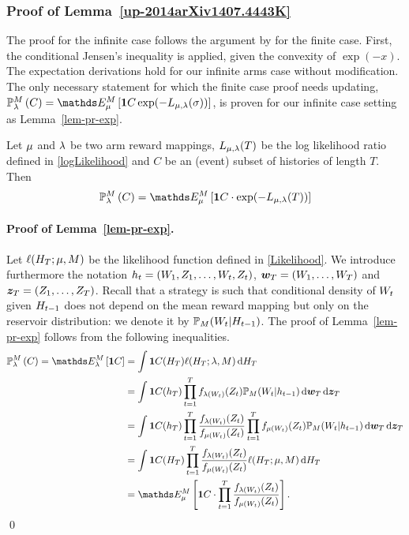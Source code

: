 \subsubsection{Proof of Lemma~\ref{up-2014arXiv1407.4443K}}

The proof for the infinite case follows the argument by \cite{JMLR15} for the
finite case. First, the conditional Jensen's inequality is applied, given the
convexity of
$\exp(-x)$.
The expectation derivations hold for our infinite arms case without
modification.
The only necessary statement for which the finite case proof needs updating,
$\PrAltModel{C} = \ETrueModel{ \1{C} \exp(-L_{\ArmMean,\ArmMeanAlt}(\sigma)) }$,
is proven for our infinite case setting as Lemma~\ref{lem-pr-exp}.


\begin{lemma}\label{lem-pr-exp}
Let $\mu$ and $\lambda$ be two arm reward mappings,
$L_{\mu,\lambda}(T)$ be the log likelihood ratio defined in \eqref{logLikelihood}
and $C$ be an (event) subset of histories of length $T$.
Then
\begin{align*}
\PrAltModel{C}
	= \ETrueModel{ \1{C} \cdot \exp(-L_{\ArmMean,\ArmMeanAlt}(T)) }
\end{align*}
\end{lemma}

\paragraph{Proof of Lemma~\ref{lem-pr-exp}.}
Let $\ell(H_T ;\mu,M)$ be the likelihood function defined in \eqref{Likelihood}.
We introduce furthermore the notation $h_t = (W_1,Z_1,\dots,W_t,Z_t)$, $\bm {w}_T=(W_1,\dots,W_T)$ and $\bm z_T =(Z_1,\dots,Z_T)$. Recall that a strategy is such that conditional density of $W_t$ given $H_{t-1}$ does not depend on the mean reward mapping but only on the reservoir distribution: we denote it by $\mathbb{P}_M(W_t | H_{t-1})$.
The proof of Lemma~\ref{lem-pr-exp} follows from the following inequalities. 
\begin{align*}
\PrAltModel{C} =
  \EAltModel{ \1{C} }
 & =  \int \1{C}(\historyRV_T) \ell(\historyRV_T; \ArmMeanAlt, \ArmMeasure) \diff \historyRV_T \\
 & = \int \1{C}(h_T)
 \prod_{t=1}^Tf_{\ArmMeanAlt(\armRV_t)}(\rewardRV_t)
 \PrNone_\ArmMeasure(\armRV_t | h_{t-1}) \diff \bm \arm_T  \diff \bm z_T \\
 & = \int \1{C}(h_T)
 	\prod_{t=1}^T\frac{f_{\ArmMeanAlt(\armRV_t)}(\rewardRV_t)}{f_{\ArmMean(\armRV_t)}(\rewardRV_t)} \prod_{t=1}^T f_{\ArmMean(\armRV_t)}(\rewardRV_t)
 \PrNone_{\ArmMeasure}(\armRV_t | h_{t-1}) \diff \bm \arm_T \diff \bm z_T \\
  & = \int \1{C}(H_T) \prod_{t=1}^T\frac{f_{\ArmMeanAlt(\armRV_t)}(\rewardRV_t)}{f_{\ArmMean(\armRV_t)}(\rewardRV_t)} \ell(\historyRV_T;\ArmMean,\ArmMeasure) \diff \historyRV_T  \\
  & = \ETrueModel{
 \1{C} \cdot\prod_{t=1}^{T} \frac{ f_{\ArmMeanAlt(\armRV_t)}(\rewardRV_t) }{ f_{\ArmMean(\armRV_t)}(\rewardRV_t) } }.
\end{align*}
\qed



